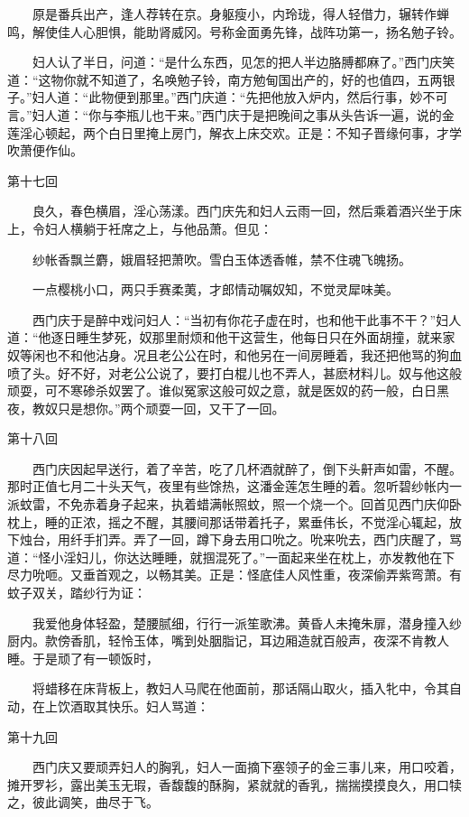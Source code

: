　　原是番兵出产，逢人荐转在京。身躯瘦小，内玲珑，得人轻借力，辗转作蝉鸣，解使佳人心胆惧，能助肾威冈。号称金面勇先锋，战阵功第一，扬名勉子铃。

　　妇人认了半日，问道：“是什么东西，见怎的把人半边胳膊都麻了。”西门庆笑道：“这物你就不知道了，名唤勉子铃，南方勉甸国出产的，好的也值四，五两银子。”妇人道：“此物便到那里。”西门庆道：“先把他放入炉内，然后行事，妙不可言。”妇人道：“你与李瓶儿也干来。”西门庆于是把晚间之事从头告诉一遍，说的金莲淫心顿起，两个白日里掩上房门，解衣上床交欢。正是：不知子晋缘何事，才学吹萧便作仙。


第十七回

　　良久，春色横眉，淫心荡漾。西门庆先和妇人云雨一回，然后乘着酒兴坐于床上，令妇人横躺于衽席之上，与他品萧。但见：

　　纱帐香飘兰麝，娥眉轻把萧吹。雪白玉体透香帷，禁不住魂飞魄扬。

　　一点樱桃小口，两只手赛柔荑，才郎情动嘱奴知，不觉灵犀味美。

　　西门庆于是醉中戏问妇人：“当初有你花子虚在时，也和他干此事不干？”妇人道：“他逐日睡生梦死，奴那里耐烦和他干这营生，他每日只在外面胡撞，就来家奴等闲也不和他沾身。况且老公公在时，和他另在一间房睡着，我还把他骂的狗血喷了头。好不好，对老公公说了，要打白棍儿也不弄人，甚麽材料儿。奴与他这般顽耍，可不寒碜杀奴罢了。谁似冤家这般可奴之意，就是医奴的药一般，白日黑夜，教奴只是想你。”两个顽耍一回，又干了一回。


第十八回

　　西门庆因起早送行，着了辛苦，吃了几杯酒就醉了，倒下头鼾声如雷，不醒。那时正值七月二十头天气，夜里有些馀热，这潘金莲怎生睡的着。忽听碧纱帐内一派蚊雷，不免赤着身子起来，执着蜡满帐照蚊，照一个烧一个。回首见西门庆仰卧枕上，睡的正浓，摇之不醒，其腰间那话带着托子，累垂伟长，不觉淫心辄起，放下烛台，用纤手扪弄。弄了一回，蹲下身去用口吮之。吮来吮去，西门庆醒了，骂道：“怪小淫妇儿，你达达睡睡，就掴混死了。”一面起来坐在枕上，亦发教他在下尽力吮咂。又垂首观之，以畅其美。正是：怪底佳人风性重，夜深偷弄紫弯萧。有蚊子双关，踏纱行为证：

　　我爱他身体轻盈，楚腰腻细，行行一派笙歌沸。黄昏人未掩朱扉，潜身撞入纱厨内。款傍香肌，轻怜玉体，嘴到处胭脂记，耳边厢造就百般声，夜深不肯教人睡。于是顽了有一顿饭时，

　　将蜡移在床背板上，教妇人马爬在他面前，那话隔山取火，插入牝中，令其自动，在上饮酒取其快乐。妇人骂道：


第十九回

　　西门庆又要顽弄妇人的胸乳，妇人一面摘下塞领子的金三事儿来，用口咬着，摊开罗衫，露出美玉无瑕，香馥馥的酥胸，紧就就的香乳，揣揣摸摸良久，用口犊之，彼此调笑，曲尽于飞。


